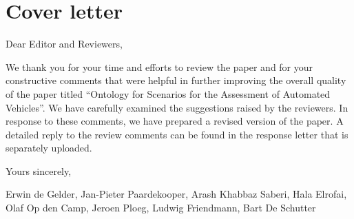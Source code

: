 \documentclass[10pt,final,a4paper,oneside,onecolumn]{article}
\begin{document}
	
\section*{Cover letter}

Dear Editor and Reviewers,

We thank you for your time and efforts to review the paper and for your constructive comments that were helpful in further improving the overall quality of the paper titled ``Ontology for Scenarios for the Assessment of Automated Vehicles''. We have carefully examined the suggestions raised by the reviewers. In response to these comments, we have prepared a revised version of the paper. A detailed reply to the review comments can be found in the response letter that is separately uploaded. 

Yours sincerely,

Erwin de Gelder, Jan-Pieter Paardekooper, Arash Khabbaz Saberi, Hala Elrofai, Olaf Op den Camp, Jeroen Ploeg, Ludwig Friendmann, Bart De Schutter
\end{document}
